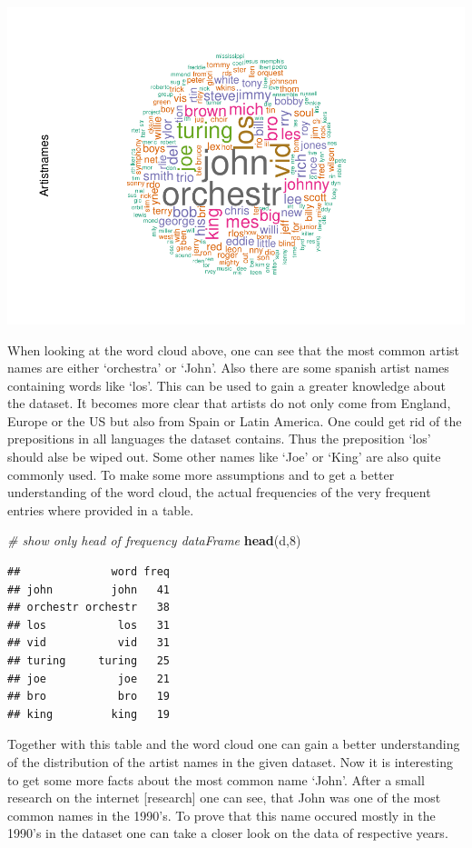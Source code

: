 \documentclass[]{article}
\newenvironment{Shaded}{\begin{snugshade}}{\end{snugshade}}
\newcommand{\KeywordTok}[1]{\textcolor[rgb]{0.13,0.29,0.53}{\textbf{#1}}}
\newcommand{\DecValTok}[1]{\textcolor[rgb]{0.00,0.00,0.81}{#1}}
\newcommand{\CommentTok}[1]{\textcolor[rgb]{0.56,0.35,0.01}{\textit{#1}}}
\newcommand{\NormalTok}[1]{#1}
\begin{document}
\includegraphics{Project2_files/figure-latex/wordclodArtist-1.pdf}

When looking at the word cloud above, one can see that the most common
artist names are either `orchestra' or `John'. Also there are some
spanish artist names containing words like `los'. This can be used to
gain a greater knowledge about the dataset. It becomes more clear that
artists do not only come from England, Europe or the US but also from
Spain or Latin America. One could get rid of the prepositions in all
languages the dataset contains. Thus the preposition `los' should alse
be wiped out. Some other names like `Joe' or `King' are also quite
commonly used. To make some more assumptions and to get a better
understanding of the word cloud, the actual frequencies of the very
frequent entries where provided in a table.

\begin{Shaded}
\begin{Highlighting}[]
\CommentTok{# show only head of frequency dataFrame}
\KeywordTok{head}\NormalTok{(d,}\DecValTok{8}\NormalTok{)}
\end{Highlighting}
\end{Shaded}

\begin{verbatim}
##              word freq
## john         john   41
## orchestr orchestr   38
## los           los   31
## vid           vid   31
## turing     turing   25
## joe           joe   21
## bro           bro   19
## king         king   19
\end{verbatim}

Together with this table and the word cloud one can gain a better
understanding of the distribution of the artist names in the given
dataset. Now it is interesting to get some more facts about the most
common name `John'. After a small research on the internet
{[}research{]} one can see, that John was one of the most common names
in the 1990's. To prove that this name occured mostly in the 1990's in
the dataset one can take a closer look on the data of respective years.
\end{document}
